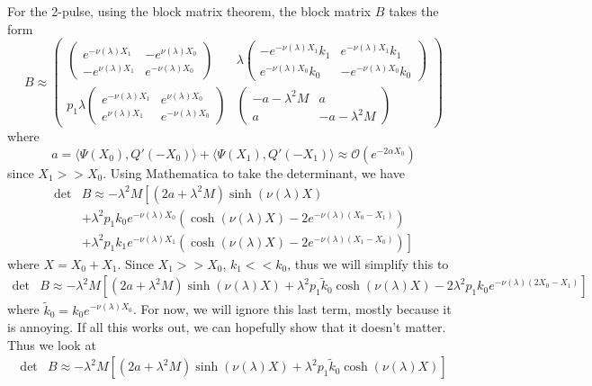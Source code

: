 \documentclass[thesis.tex]{subfiles}
\begin{document}
For the 2-pulse, using the block matrix theorem, the block matrix $B$ takes the form
\[
B \approx \begin{pmatrix}
\begin{pmatrix}
e^{-\nu(\lambda)X_1} & -e^{\nu(\lambda)X_0} \\
-e^{\nu(\lambda)X_1} & e^{-\nu(\lambda)X_0} 
\end{pmatrix} &
\lambda \begin{pmatrix}
-e^{-\nu(\lambda)X_1} k_1 & e^{-\nu(\lambda)X_1} k_1 \\ e^{-\nu(\lambda)X_0} k_0 & -e^{-\nu(\lambda)X_0} k_0
\end{pmatrix} \\
p_1 \lambda
\begin{pmatrix}
e^{-\nu(\lambda)X_1} & e^{\nu(\lambda)X_0} \\
e^{\nu(\lambda)X_1} & e^{-\nu(\lambda)X_0} 
\end{pmatrix} &
\begin{pmatrix}
-a - \lambda^2 M & a \\
a & -a - \lambda^2 M
\end{pmatrix}
\end{pmatrix}
\]
where
\[
a = \langle \Psi(X_0), Q'(-X_0) \rangle
+ \langle \Psi(X_1), Q'(-X_1) \rangle \approx \mathcal{O}(e^{-2\alpha X_0})
\]
since $X_1 >> X_0$. Using Mathematica to take the determinant, we have
\begin{align*}
\det &B \approx -\lambda^2 M \left[ (2a + \lambda^2 M) \sinh(\nu(\lambda)X) \right. \\
&+ \left. \lambda^2 p_1 k_0 e^{-\nu(\lambda) X_0}\left( \cosh (\nu(\lambda) X) - 2 e^{-\nu(\lambda) (X_0 - X_1) } \right) \right. \\
&+ \left. \lambda^2 p_1 k_1 e^{-\nu(\lambda) X_1}\left( \cosh (\nu(\lambda) X) - 2 e^{-\nu(\lambda) (X_1 - X_0) } \right) \right] 
\end{align*}
where $X = X_0 + X_1$. Since $X_1 >> X_0$, $k_1 << k_0$, thus we will simplify this to 
\begin{align*}
\det &B \approx -\lambda^2 M \left[ (2a + \lambda^2 M) \sinh(\nu(\lambda)X) + \lambda^2 p_1 \tilde{k}_0 \cosh (\nu(\lambda) X) - 2 \lambda^2 p_1 k_0 e^{-\nu(\lambda) (2 X_0 - X_1) } \right] 
\end{align*}
where $\tilde{k}_0 = k_0 e^{-\nu(\lambda) X_0}$. For now, we will ignore this last term, mostly because it is annoying. If all this works out, we can hopefully show that it doesn't matter. Thus we look at 
\begin{align*}
\det &B \approx -\lambda^2 M \left[ (2a + \lambda^2 M) \sinh(\nu(\lambda)X) + \lambda^2 p_1 \tilde{k}_0 \cosh (\nu(\lambda) X) \right] 
\end{align*}
\end{document}
